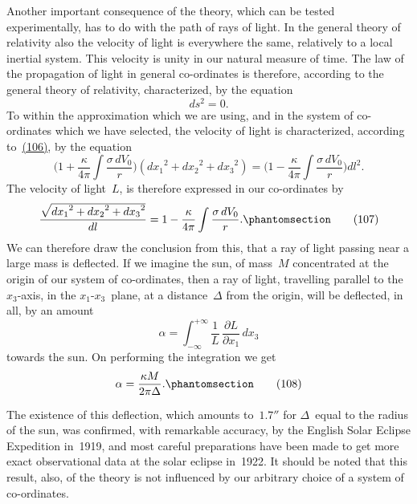 \documentclass[12pt]{book}[2005/09/16]
\newcommand{\Change}[2]{#2}
\newcommand{\Add}[1]{\Change{}{#1}}
\newcommand{\PageSep}[1]{\ignorespaces}
\newcommand{\Tag}[1]{%
  \phantomsection
  \label{eqn:#1}
  \tag*{#1}
}
\newcommand{\Eqref}[1]{\hyperref[eqn:#1]{#1}}
\newcommand{\dd}{\partial}
\begin{document}
Another important consequence of the theory, which
%
%
%
can be tested experimentally, has to do with the path of
rays of light. In the general theory of relativity also
the velocity of light is everywhere the same, relatively to
a local inertial system. This velocity is unity in our
natural measure of time. The law of the propagation of
light in general co-ordinates is therefore, according to the
general theory of relativity, characterized, by the equation
\[
ds^{2} = 0.
\]
To within the approximation which we are using, and in
the system of co-ordinates which we have selected, the
velocity of light is characterized, according to~\Eqref{(106)}, by
the equation
\[
\biggl(1 + \frac{\kappa}{4\pi} \int \frac{\sigma\, dV_{0}}{r}\biggr)
  ({dx_{1}}^{2} + {dx_{2}}^{2} + {dx_{3}}^{2})
  = \biggl(1 - \frac{\kappa}{4\pi} \int \frac{\sigma\, dV_{0}}{r}\biggr) dl^{2}.
\]
The velocity of light~$L$, is therefore expressed in our
co-ordinates by
\[
\frac{\sqrt{{dx_{1}}^{2} + {dx_{2}}^{2} + {dx_{3}}^{2}}}{dl}
  = 1 - \frac{\kappa}{4\pi} \int \frac{\sigma\, dV_{0}}{r}\Add{.}
\Tag{(107)}
\]
We can therefore draw the conclusion from this, that a
ray of light passing near a large mass is deflected. If
we imagine the sun, of mass~$M$ concentrated at the
origin of our system of co-ordinates, then a ray of light,
travelling parallel to the $x_{3}$-axis, in the $x_{1}$-$x_{3}$~plane,
at a distance~$\Delta$ from the origin, will be deflected, in all,
by an amount
\PageSep{103}
\[
\alpha = \int_{-\infty}^{+\infty} \frac{1}{L}\, \frac{\dd L}{\dd x_{1}}\, dx_{3}
\]
towards the sun. On performing the integration we get
\[
\alpha = \frac{\kappa M}{2\pi\Delta}\Add{.}
\Tag{(108)}
\]

The existence of this deflection, which amounts to~$1.7''$
for $\Delta$~equal to the radius of the sun, was confirmed,
with remarkable accuracy, by the English Solar Eclipse
%
Expedition in~1919, and most careful preparations have
been made to get more exact observational data at the
solar eclipse in~1922. It should be noted that this
result, also, of the theory is not influenced by our
arbitrary choice of a system of co-ordinates.
\end{document}
